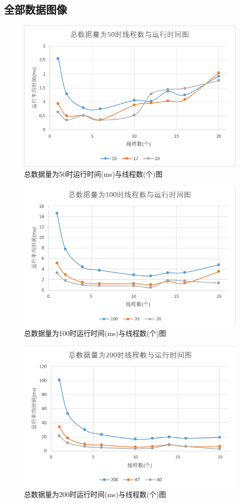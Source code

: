\documentclass[UTF8]{ctexart}
\begin{document}
\subsection{全部数据图像}
\begin{figure}[H]
    \centering
    \includegraphics[scale=0.7]{50.png}
    \caption{总数据量为50时运行时间(ms)与线程数(个)图}
\end{figure}
\begin{figure}[H]
    \centering
    \includegraphics[scale=0.7]{100.png}
    \caption{总数据量为100时运行时间(ms)与线程数(个)图}
\end{figure}
\begin{figure}[H]
    \centering
    \includegraphics[scale=0.7]{200.png}
    \caption{总数据量为200时运行时间(ms)与线程数(个)图}
\end{figure}
\end{document}
